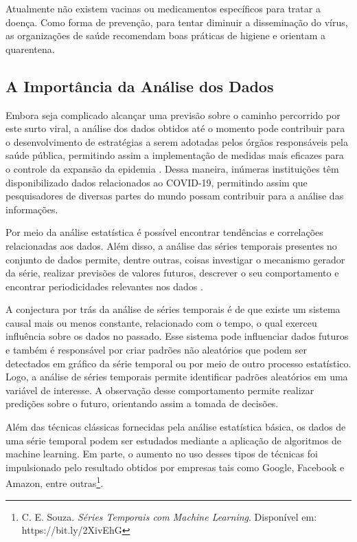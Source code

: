 \documentclass{ieeeaccess}
\begin{document}
Atualmente não existem vacinas ou medicamentos específicos para tratar a doença. Como forma de prevenção, para tentar diminuir a disseminação do vírus, as organizações de saúde recomendam boas práticas de higiene e orientam a quarentena.

\subsection{A Importância da Análise dos Dados}

Embora seja complicado alcançar uma previsão sobre o caminho percorrido por este surto viral, a análise dos dados obtidos até o momento pode contribuir para o desenvolvimento de estratégias a serem adotadas pelos órgãos responsáveis pela saúde pública, permitindo assim a implementação de medidas mais eficazes para o controle da expansão da epidemia \cite{b8}. Dessa maneira, inúmeras instituições têm disponibilizado dados relacionados ao COVID-19, permitindo assim que pesquisadores de diversas partes do mundo possam contribuir para a análise das informações. 

Por meio da análise estatística é possível encontrar tendências e correlações relacionadas aos dados. Além disso, a análise das séries temporais presentes no conjunto de dados permite, dentre outras, coisas investigar o mecanismo gerador da série, realizar previsões de valores futuros, descrever o seu comportamento e encontrar periodicidades relevantes nos dados \cite{b13}. 

A conjectura por trás da análise de séries temporais é de que existe um sistema causal mais ou menos constante, relacionado com o tempo, o qual exerceu influência sobre os dados no passado. Esse sistema pode influenciar dados futuros e também é responsável por criar padrões não aleatórios que podem ser detectados em gráfico da série temporal ou por meio de outro processo estatístico. Logo, a análise de séries temporais permite identificar padrões aleatórios em uma variável de interesse. A observação desse comportamento permite realizar predições sobre o futuro, orientando assim a tomada de decisões.

Além das técnicas clássicas fornecidas pela análise estatística básica, os dados de uma série temporal podem ser estudados mediante a aplicação de algoritmos de machine learning. Em parte, o aumento no uso desses tipos de técnicas foi impulsionado pelo resultado obtidos por empresas tais como Google, Facebook e Amazon, entre outras\footnote{C. E. Souza. \textit{Séries Temporais com Machine Learning}. Disponível em: https://bit.ly/2XivEhG}.
\end{document}
